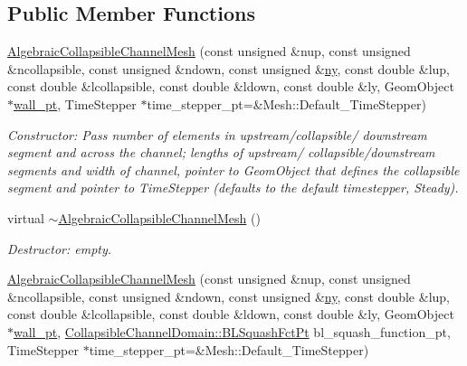 \subsection*{Public Member Functions}
\begin{DoxyCompactItemize}
\item 
\hyperlink{classoomph_1_1AlgebraicCollapsibleChannelMesh_ac2e77539dfed482cc3d8b7c9e17a9567}{Algebraic\+Collapsible\+Channel\+Mesh} (const unsigned \&nup, const unsigned \&ncollapsible, const unsigned \&ndown, const unsigned \&\hyperlink{classoomph_1_1SimpleRectangularQuadMesh_a45011f22dedd480392b1f376e4269921}{ny}, const double \&lup, const double \&lcollapsible, const double \&ldown, const double \&ly, Geom\+Object $\ast$\hyperlink{classoomph_1_1CollapsibleChannelMesh_a04ffeb61678763dfd250962ea9ba614b}{wall\+\_\+pt}, Time\+Stepper $\ast$time\+\_\+stepper\+\_\+pt=\&Mesh\+::\+Default\+\_\+\+Time\+Stepper)
\begin{DoxyCompactList}\small\item\em Constructor\+: Pass number of elements in upstream/collapsible/ downstream segment and across the channel; lengths of upstream/ collapsible/downstream segments and width of channel, pointer to Geom\+Object that defines the collapsible segment and pointer to Time\+Stepper (defaults to the default timestepper, Steady). \end{DoxyCompactList}\item 
virtual \hyperlink{classoomph_1_1AlgebraicCollapsibleChannelMesh_ab921ed3dbc5678fc5d39626fdf32c4ed}{$\sim$\+Algebraic\+Collapsible\+Channel\+Mesh} ()
\begin{DoxyCompactList}\small\item\em Destructor\+: empty. \end{DoxyCompactList}\item 
\hyperlink{classoomph_1_1AlgebraicCollapsibleChannelMesh_a3c19524e69a9408c79047d130b79d6b3}{Algebraic\+Collapsible\+Channel\+Mesh} (const unsigned \&nup, const unsigned \&ncollapsible, const unsigned \&ndown, const unsigned \&\hyperlink{classoomph_1_1SimpleRectangularQuadMesh_a45011f22dedd480392b1f376e4269921}{ny}, const double \&lup, const double \&lcollapsible, const double \&ldown, const double \&ly, Geom\+Object $\ast$\hyperlink{classoomph_1_1CollapsibleChannelMesh_a04ffeb61678763dfd250962ea9ba614b}{wall\+\_\+pt}, \hyperlink{classoomph_1_1CollapsibleChannelDomain_a2bf1d7943bfac134a5c27a54c7e1faed}{Collapsible\+Channel\+Domain\+::\+B\+L\+Squash\+Fct\+Pt} bl\+\_\+squash\+\_\+function\+\_\+pt, Time\+Stepper $\ast$time\+\_\+stepper\+\_\+pt=\&Mesh\+::\+Default\+\_\+\+Time\+Stepper)

\end{DoxyCompactItemize}
